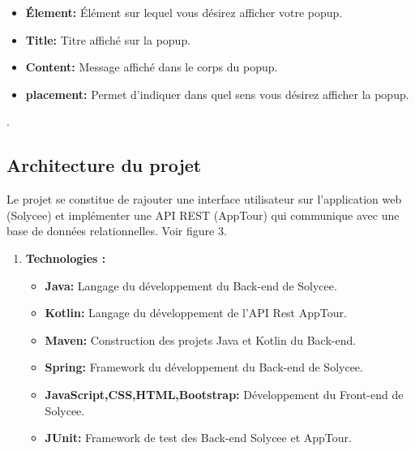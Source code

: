 \documentclass[12pt]{article}
\begin{document}
\begin{itemize}
\item \textbf{Élement: } Élément sur lequel vous désirez afficher votre popup.\footnotemark
\item \textbf{Title: } Titre affiché sur la popup. 
\item \textbf{Content: } Message affiché dans le corps du popup.
\item \textbf{placement: } Permet d’indiquer dans quel sens vous désirez afficher la popup.
\end{itemize}

.
 



\subsection{Architecture du projet}

Le projet se constitue de rajouter une interface utilisateur sur l'application web (Solycee) et  implémenter une API REST (AppTour) qui communique avec une base de données relationnelles. Voir figure 3.

\begin{enumerate}
\item \textbf{Technologies :}\\

\begin{itemize}
\item \textbf{Java: }Langage du développement du Back-end de Solycee. 
\item \textbf{Kotlin: }Langage du développement de l'API Rest AppTour. 
\item \textbf{Maven: }Construction des projets Java et Kotlin du Back-end.
\item \textbf{Spring: } Framework du développement du Back-end de Solycee.
\item \textbf{JavaScript,CSS,HTML,Bootstrap: } Développement du Front-end de Solycee.
\item \textbf{JUnit: } Framework de test des Back-end Solycee et AppTour. 
\end{itemize} 
\end{enumerate}
\end{document}
